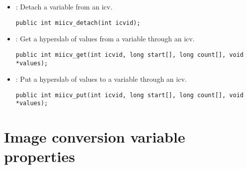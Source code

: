 \begin{itemize}
\item {} : Detach a variable from an icv.
\begin{verbatim}
public int miicv_detach(int icvid);
\end{verbatim}

\item {} : Get a hyperslab of values from a variable
through an icv.
\begin{verbatim}
public int miicv_get(int icvid, long start[], long count[], void *values);
\end{verbatim}

\item {} : Put a hyperslab of values to a variable
through an icv.
\begin{verbatim}
public int miicv_put(int icvid, long start[], long count[], void *values);
\end{verbatim}

\end{itemize}

\section{Image conversion variable properties}

